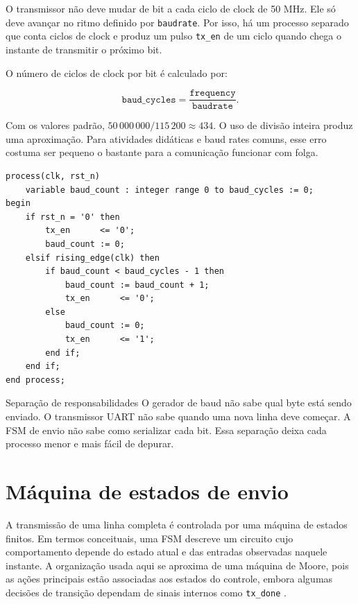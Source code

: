 \documentclass[12pt,a4paper]{book}
\begin{document}
O transmissor não deve mudar de bit a cada ciclo de clock de 50 MHz. Ele só deve avançar no ritmo definido por \texttt{baudrate}. Por isso, há um processo separado que conta ciclos de clock e produz um pulso \texttt{tx\_en} de um ciclo quando chega o instante de transmitir o próximo bit.

O número de ciclos de clock por bit é calculado por:

\[
\texttt{baud\_cycles}=\frac{\texttt{frequency}}{\texttt{baudrate}}.
\]

Com os valores padrão, \(50\,000\,000/115\,200 \approx 434\). O uso de divisão inteira produz uma aproximação. Para atividades didáticas e baud rates comuns, esse erro costuma ser pequeno o bastante para a comunicação funcionar com folga.

\begin{lstlisting}[caption={Gerador de pulso na frequência de baud.}]
process(clk, rst_n)
    variable baud_count : integer range 0 to baud_cycles := 0;
begin
    if rst_n = '0' then
        tx_en      <= '0';
        baud_count := 0;
    elsif rising_edge(clk) then
        if baud_count < baud_cycles - 1 then
            baud_count := baud_count + 1;
            tx_en      <= '0';
        else
            baud_count := 0;
            tx_en      <= '1';
        end if;
    end if;
end process;
\end{lstlisting}

\begin{observacao}{Separação de responsabilidades}
O gerador de baud não sabe qual byte está sendo enviado. O transmissor UART não sabe quando uma nova linha deve começar. A FSM de envio não sabe como serializar cada bit. Essa separação deixa cada processo menor e mais fácil de depurar.
\end{observacao}

\section{Máquina de estados de envio}

A transmissão de uma linha completa é controlada por uma máquina de estados finitos. Em termos conceituais, uma FSM descreve um circuito cujo comportamento depende do estado atual e das entradas observadas naquele instante. A organização usada aqui se aproxima de uma máquina de Moore, pois as ações principais estão associadas aos estados do controle, embora algumas decisões de transição dependam de sinais internos como \texttt{tx\_done} \cite{moore_machine_wiki,mealy_machine_wiki}.
\end{document}
